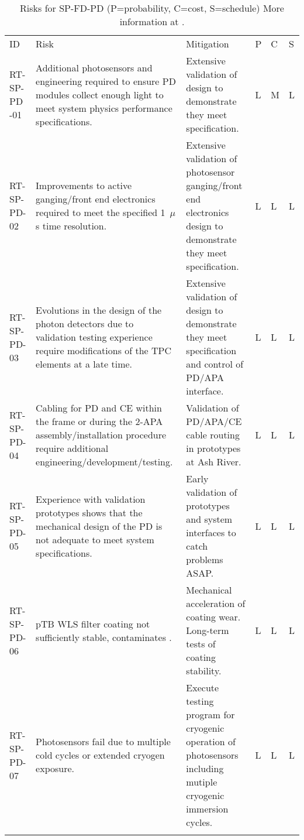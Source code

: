 
\begin{footnotesize}
\begin{longtable}{P{0.18\textwidth}P{0.20\textwidth}P{0.32\textwidth}P{0.02\textwidth}P{0.02\textwidth}P{0.02\textwidth}} 
\caption[Risks for SP-FD-PD]{Risks for SP-FD-PD (P=probability, C=cost, S=schedule) More information at . } \\
ID & Risk & Mitigation & P & C & S  \\  \colhline
RT-SP-PD -01 & Additional photosensors and engineering required to ensure PD modules collect enough light to meet system physics performance specifications. & Extensive validation of  design to demonstrate they meet specification. & L & M & L \\  \colhline
RT-SP-PD-02 & Improvements to active ganging/front end electronics required to meet the specified 1~$\mu$s time resolution. & Extensive validation of photosensor ganging/front end electronics design to demonstrate they meet specification. & L & L & L \\  \colhline
RT-SP-PD-03 & Evolutions in the design of the photon detectors due to validation testing experience require modifications of the TPC elements at a late time. & Extensive validation of  design to demonstrate they meet specification and control of PD/APA interface. & L & L & L \\  \colhline
RT-SP-PD-04 & Cabling for PD and CE within the  frame or during the 2-APA assembly/installation procedure require additional engineering/development/testing. & Validation of PD/APA/CE cable routing in prototypes at Ash River. & L & L & L \\  \colhline
RT-SP-PD-05 & Experience with validation prototypes shows that the mechanical design of the PD is not adequate to meet system specifications. & Early validation of  prototypes and system interfaces to catch problems ASAP. & L & L & L \\  \colhline
RT-SP-PD-06 & pTB WLS filter coating not sufficiently stable, contaminates . & Mechanical acceleration of coating wear.  Long-term tests of coating stability. & L & L & L \\  \colhline
RT-SP-PD-07 & Photosensors fail due to multiple cold cycles or extended cryogen exposure. & Execute testing program for cryogenic operation of photosensors including mutiple cryogenic immersion cycles. & L & L & L \\  \colhline

\end{longtable}
\end{footnotesize}
